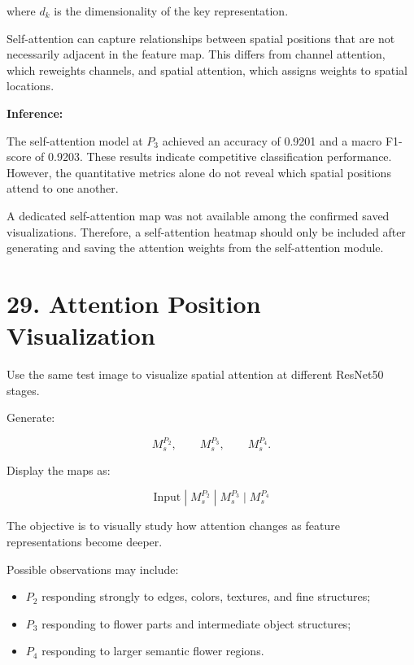 \documentclass[10pt]{article}
\begin{document}
where $d_k$ is the dimensionality of the key representation.

Self-attention can capture relationships between spatial positions
that are not necessarily adjacent in the feature map. This differs
from channel attention, which reweights channels, and spatial
attention, which assigns weights to spatial locations.

\noindent\textbf{Inference:}

The self-attention model at $P_3$ achieved an accuracy of 0.9201
and a macro F1-score of 0.9203. These results indicate competitive
classification performance. However, the quantitative metrics alone
do not reveal which spatial positions attend to one another.

A dedicated self-attention map was not available among the confirmed
saved visualizations. Therefore, a self-attention heatmap should
only be included after generating and saving the attention weights
from the self-attention module.

\section*{29. Attention Position Visualization}

Use the same test image to visualize spatial attention at different ResNet50
stages.

Generate:

\[
M_s^{P_2},
\qquad
M_s^{P_3},
\qquad
M_s^{P_4}.
\]

Display the maps as:

\[
\boxed{
\text{Input}
\;|\;
M_s^{P_2}
\;|\;
M_s^{P_3}
\;|\;
M_s^{P_4}
}
\]

The objective is to visually study how attention changes as feature
representations become deeper.

Possible observations may include:

\begin{itemize}

\item $P_2$ responding strongly to edges, colors, textures, and fine
structures;

\item $P_3$ responding to flower parts and intermediate object structures;

\item $P_4$ responding to larger semantic flower regions.

\end{itemize}
\end{document}
